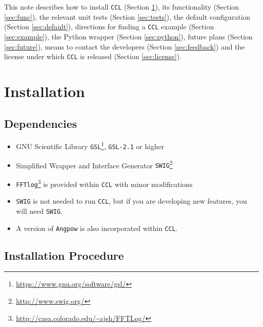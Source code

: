 \documentclass[\docopts]{\docclass}
\begin{document}
This note describes how to install {\tt CCL} (Section \ref{sec:install}), its functionality (Section \ref{sec:func}), the relevant unit tests (Section \ref{sec:tests}), the default configuration (Section \ref{sec:default}), directions for finding a {\tt CCL} example (Section \ref{sec:example}), the Python wrapper (Section \ref{sec:python}), future plans (Section \ref{sec:future}), means to contact the developers (Section \ref{sec:feedback}) and the license under which {\tt CCL} is released (Section \ref{sec:license}).


\section{Installation}
\label{sec:install}

\subsection{Dependencies}

\begin{itemize}
\item GNU Scientific Library {\tt GSL}\footnote{\url{https://www.gnu.org/software/gsl/}}, {\tt GSL-2.1} or higher
\item Simplified Wrapper and Interface Generator {\tt SWIG}\footnote{\url{http://www.swig.org/}}
\item {\tt FFTlog}\footnote{\url{http://casa.colorado.edu/~ajsh/FFTLog/}} is provided within {\tt CCL} with minor modifications
\item {\tt SWIG} is not needed to run {\tt CCL}, but if you are developing new features, you will need {\tt SWIG}.
\item A version of {\tt Angpow} \citep{2017arXiv170103592C} is also incorporated within {\tt CCL}.
\end{itemize}

\subsection{Installation Procedure}
\end{document}
